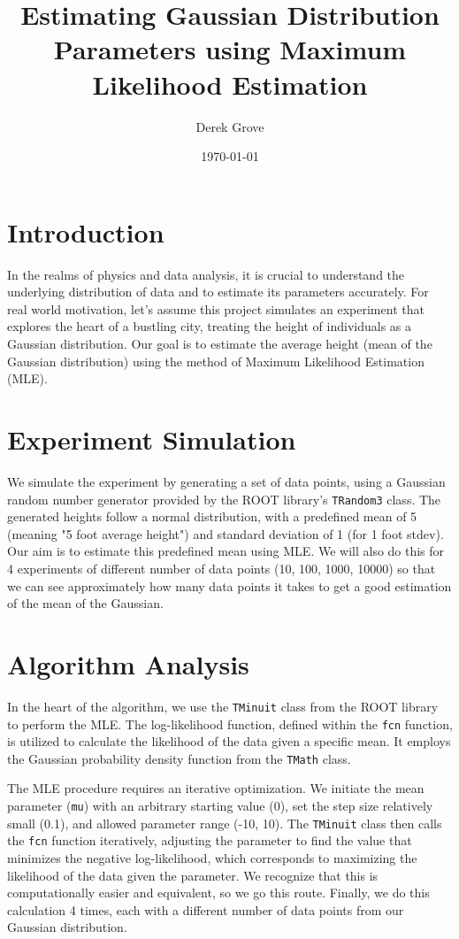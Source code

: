 \documentclass[12pt]{article}
\title{Estimating Gaussian Distribution Parameters using Maximum Likelihood Estimation}
\author{Derek Grove}
\date{\today}
\begin{document}
\maketitle

\section*{Introduction}

In the realms of physics and data analysis, it is crucial to understand the underlying distribution of data and to estimate its parameters accurately. For real world motivation, let's assume this project simulates an experiment that explores the heart of a bustling city, treating the height of individuals as a Gaussian distribution. Our goal is to estimate the average height (mean of the Gaussian distribution) using the method of Maximum Likelihood Estimation (MLE).

\section*{Experiment Simulation}

We simulate the experiment by generating a set of data points, using a Gaussian random number generator provided by the ROOT library's \texttt{TRandom3} class. The generated heights follow a normal distribution, with a predefined mean of 5 (meaning "5 foot average height") and standard deviation of 1 (for 1 foot stdev). Our aim is to estimate this predefined mean using MLE. We will also do this for 4 experiments of different number of data points (10, 100, 1000, 10000) so that we can see approximately how many data points it takes to get a good estimation of the mean of the Gaussian.

\section*{Algorithm Analysis}

In the heart of the algorithm, we use the \texttt{TMinuit} class from the ROOT library to perform the MLE. The log-likelihood function, defined within the \texttt{fcn} function, is utilized to calculate the likelihood of the data given a specific mean. It employs the Gaussian probability density function from the \texttt{TMath} class. 

The MLE procedure requires an iterative optimization. We initiate the mean parameter (\texttt{mu}) with an arbitrary starting value (0), set the step size relatively small (0.1), and allowed parameter range (-10, 10). The \texttt{TMinuit} class then calls the \texttt{fcn} function iteratively, adjusting the parameter to find the value that minimizes the negative log-likelihood, which corresponds to maximizing the likelihood of the data given the parameter. We recognize that this is computationally easier and equivalent, so we go this route.
Finally, we do this calculation 4 times, each with a different number of data points from our Gaussian distribution. 
\end{document}
